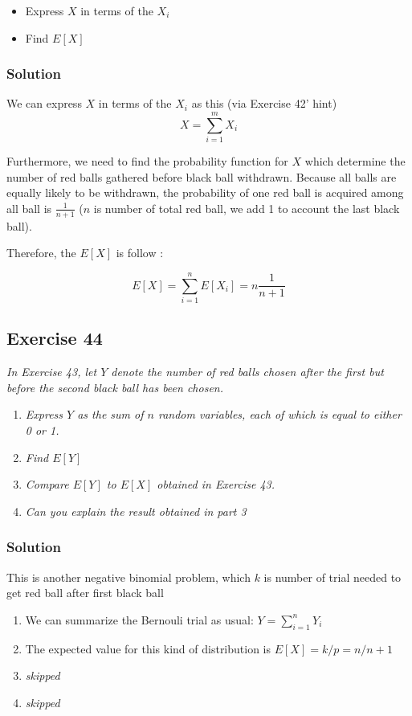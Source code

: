 \documentclass[12pt,a4paper]{article}
\begin{document}
\begin{itemize}
    \item Express $X$ in terms of the $X_i$
    \item Find $E[X]$
\end{itemize}

\subsubsection{Solution}

We can express $X$ in terms of the $X_i$ as this (via Exercise 42' hint)
\[
    X = \sum_{i=1}^mX_i
\]

Furthermore, we need to find the probability function for $X$ which determine the number of red balls gathered before black ball withdrawn. Because all balls are equally likely to be withdrawn, the probability of one red ball is acquired among all ball is $\frac{1}{n+1}$ ($n$ is number of total red ball, we add 1 to account the last black ball). 

Therefore, the $E[X]$ is follow :

\[
E[X] = \sum_{i=1}^n E[X_i] = n \frac{1}{n+1}
\]

\subsection{Exercise 44}

\textit{In Exercise 43, let $Y$ denote the number of red balls chosen after the first but before the second black ball has been chosen.}

\begin{enumerate}
    \item \textit{Express $Y$ as the sum of $n$ random variables, each of which is equal to either 0 or 1.}
    \item \textit{Find $E[Y]$}
    \item \textit{Compare $E[Y]$ to $E[X]$ obtained in Exercise 43.}
    \item \textit{Can you explain the result obtained in part 3}
\end{enumerate}

\subsubsection{Solution}
This is another negative binomial problem, which $k$ is number of trial needed to get red ball after first black ball
\begin{enumerate}
    \item We can summarize the Bernouli trial as usual: $Y = \sum_{i=1}^nY_i$
    \item The expected value for this kind of distribution is $E[X] = k/p = n / n+1$
    \item \textit{skipped}
    \item \textit{skipped}
\end{enumerate}
\end{document}
